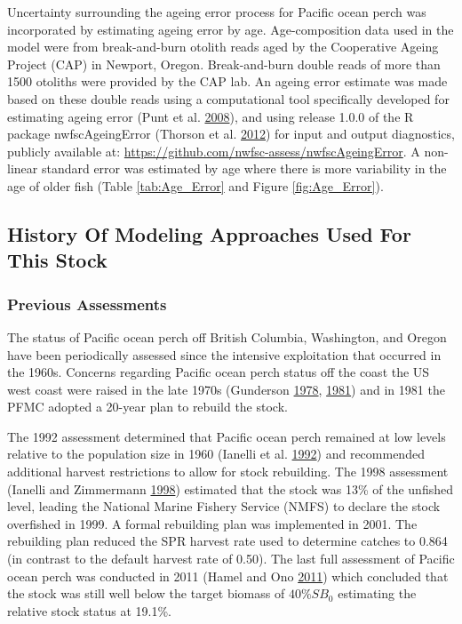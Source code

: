 \documentclass[12pt,]{article}
\begin{document}
Uncertainty surrounding the ageing error process for Pacific ocean perch
was incorporated by estimating ageing error by age. Age-composition data
used in the model were from break-and-burn otolith reads aged by the
Cooperative Ageing Project (CAP) in Newport, Oregon. Break-and-burn
double reads of more than 1500 otoliths were provided by the CAP lab. An
ageing error estimate was made based on these double reads using a
computational tool specifically developed for estimating ageing error
(Punt et al. \protect\hyperlink{ref-punt_quantifying_2008}{2008}), and
using release 1.0.0 of the R package nwfscAgeingError (Thorson et al.
\protect\hyperlink{ref-thorson_nwfscageingerror:_2012}{2012}) for input
and output diagnostics, publicly available at:
\url{https://github.com/nwfsc-assess/nwfscAgeingError}. A non-linear
standard error was estimated by age where there is more variability in
the age of older fish (Table \ref{tab:Age_Error} and Figure
\ref{fig:Age_Error}).

\subsection{History Of Modeling Approaches Used For This
Stock}\label{history-of-modeling-approaches-used-for-this-stock}

\subsubsection{Previous Assessments}\label{previous-assessments}

The status of Pacific ocean perch off British Columbia, Washington, and
Oregon have been periodically assessed since the intensive exploitation
that occurred in the 1960s. Concerns regarding Pacific ocean perch
status off the coast the US west coast were raised in the late 1970s
(Gunderson \protect\hyperlink{ref-gunderson_results_1978}{1978},
\protect\hyperlink{ref-gunderson_updated_1981}{1981}) and in 1981 the
PFMC adopted a 20-year plan to rebuild the stock.

The 1992 assessment determined that Pacific ocean perch remained at low
levels relative to the population size in 1960 (Ianelli et al.
\protect\hyperlink{ref-ianelli_status_1992}{1992}) and recommended
additional harvest restrictions to allow for stock rebuilding. The 1998
assessment (Ianelli and Zimmermann
\protect\hyperlink{ref-ianelli_status_1998}{1998}) estimated that the
stock was 13\% of the unfished level, leading the National Marine
Fishery Service (NMFS) to declare the stock overfished in 1999. A formal
rebuilding plan was implemented in 2001. The rebuilding plan reduced the
SPR harvest rate used to determine catches to 0.864 (in contrast to the
default harvest rate of 0.50). The last full assessment of Pacific ocean
perch was conducted in 2011 (Hamel and Ono
\protect\hyperlink{ref-hamel_stock_2011}{2011}) which concluded that the
stock was still well below the target biomass of \(40\%SB_{0}\)
estimating the relative stock status at 19.1\%.
\end{document}
